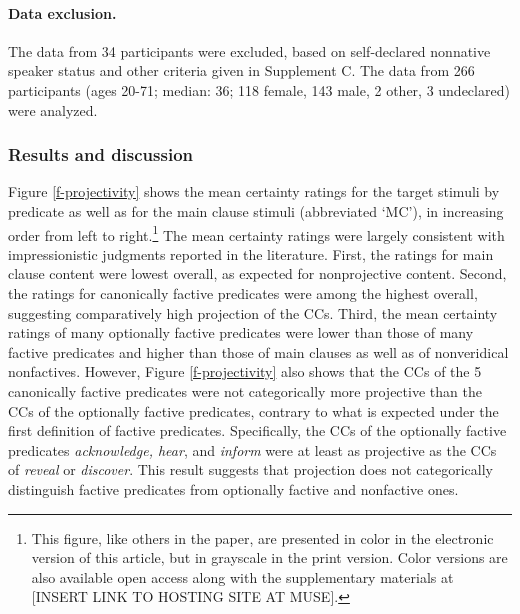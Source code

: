 \documentclass{language}
\newcommand{\6}{\mbox{$[\hspace*{-.6mm}[$}}
\newcommand{\9}{\mbox{$]\hspace*{-.6mm}]$}}
\begin{document}

\paragraph{Data exclusion.} The data from 34 participants were excluded, based on self-declared nonnative speaker status and other criteria given in Supplement C. The data from 266 participants (ages 20-71; median: 36; 118 female, 143 male, 2 other, 3 undeclared) were analyzed.

\subsubsection{Results and discussion}\label{s22}

Figure \ref{f-projectivity} shows the mean certainty ratings for the target stimuli by predicate as well as for the main clause stimuli (abbreviated `MC'), in increasing order from left to right.\footnote{This figure, like others in the paper, are presented in color in the electronic version of this article, but in grayscale in the print version. Color versions are also available open access along with the supplementary materials at [INSERT LINK TO HOSTING SITE AT MUSE]. } The mean certainty ratings were largely consistent with impressionistic judgments reported in the literature. First, the ratings for main clause content were lowest overall, as expected for nonprojective content. Second, the ratings for canonically factive predicates were among the highest overall, suggesting comparatively high projection of the CCs. Third, the mean certainty ratings of many optionally factive predicates were lower than those of many factive predicates and higher than those of main clauses as well as of nonveridical nonfactives. However, Figure \ref{f-projectivity} also shows that the CCs of the 5 canonically factive predicates were not categorically more projective than the CCs of the optionally factive predicates, contrary to what is expected under the first definition of factive predicates. Specifically, the CCs of the optionally factive predicates {\em acknowledge, hear}, and {\em inform} were at least as projective as the CCs of {\em reveal} or {\em discover}. This result suggests that projection does not categorically distinguish factive predicates from optionally factive and nonfactive ones.
\end{document}
